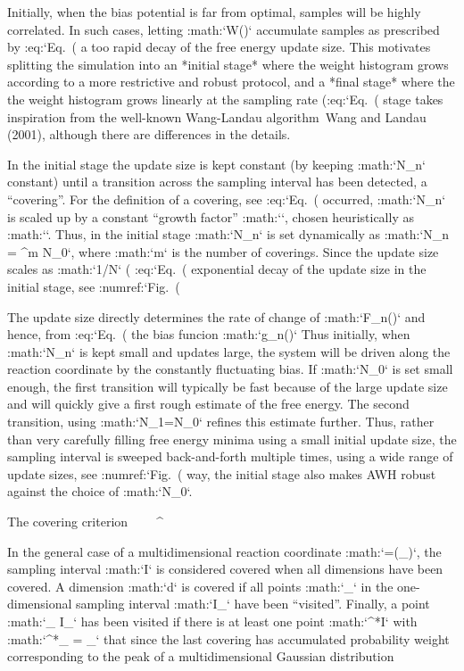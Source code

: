 Initially, when the bias potential is far from optimal, samples will be
highly correlated. In such cases, letting :math:`W(\lambda)` accumulate
samples as prescribed by :eq:`Eq. (%
a too rapid decay of the free energy update size. This motivates
splitting the simulation into an *initial stage* where the weight
histogram grows according to a more restrictive and robust protocol, and
a *final stage* where the the weight histogram grows linearly at the
sampling rate (:eq:`Eq. (%
stage takes inspiration from the well-known Wang-Landau algorithm Wang
and Landau (2001), although there are differences in the details.

In the initial stage the update size is kept constant (by keeping
:math:`N_n` constant) until a transition across the sampling interval
has been detected, a “covering”. For the definition of a covering, see
:eq:`Eq. (%
occurred, :math:`N_n` is scaled up by a constant “growth factor”
:math:`\gamma`, chosen heuristically as :math:``. Thus, in the
initial stage :math:`N_n` is set dynamically as
:math:`N_{n} = \gamma^{m} N_0`, where :math:`m` is the number of
coverings. Since the update size scales as :math:`1/N` (
:eq:`Eq. (%
exponential decay of the update size in the initial stage, see
:numref:`Fig. (%

The update size directly determines the rate of change of
:math:`F_n(\lambda)` and hence, from
:eq:`Eq. (%
the bias funcion :math:`g_n(\lambda)` Thus initially, when :math:`N_n`
is kept small and updates large, the system will be driven along the
reaction coordinate by the constantly fluctuating bias. If :math:`N_0`
is set small enough, the first transition will typically be fast because
of the large update size and will quickly give a first rough estimate of
the free energy. The second transition, using :math:`N_1=\gamma N_0`
refines this estimate further. Thus, rather than very carefully filling
free energy minima using a small initial update size, the sampling
interval is sweeped back-and-forth multiple times, using a wide range of
update sizes, see :numref:`Fig. (%
way, the initial stage also makes AWH robust against the choice of
:math:`N_0`.

The covering criterion
^^^^^^^^^^^^^^^^^^^^^^

In the general case of a multidimensional reaction coordinate
:math:`\lambda=(\lambda_{\mu})`, the sampling interval :math:`I` is
considered covered when all dimensions have been covered. A dimension
:math:`d` is covered if all points :math:`\lambda_{\mu}` in the
one-dimensional sampling interval :math:`I_{\mu}` have been “visited”.
Finally, a point :math:`\lambda_{\mu} \in I_{\mu}` has been visited if there is
at least one point :math:`\lambda^*\in I` with
:math:`\lambda^*_{\mu} = \lambda_{\mu}` that since the last covering has
accumulated probability weight corresponding to the peak of a
multidimensional Gaussian distribution


